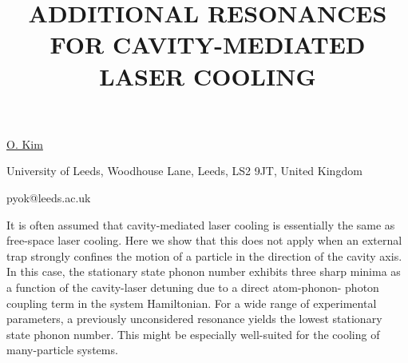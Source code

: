 \title{ADDITIONAL RESONANCES FOR CAVITY-MEDIATED LASER COOLING}

\underline{O. Kim} 

{\normalsize{\vspace{-4mm}}
University of Leeds,
Woodhouse Lane,
Leeds,
LS2 9JT,
United Kingdom

\email pyok@leeds.ac.uk}

It is often assumed that cavity-mediated laser cooling is essentially the same as free-space laser
cooling. Here we show that this does not apply when an external trap strongly confines the motion
of a particle in the direction of the cavity axis. In this case, the stationary state phonon number
exhibits three sharp minima as a function of the cavity-laser detuning due to a direct atom-phonon-
photon coupling term in the system Hamiltonian. For a wide range of experimental parameters, a
previously unconsidered resonance yields the lowest stationary state phonon number. This might be
especially well-suited for the cooling of many-particle systems.

\vspace{\baselineskip}
